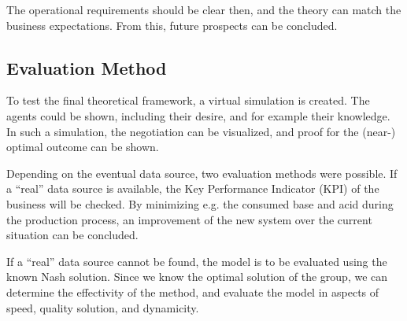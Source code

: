 The operational requirements  should be clear then, and the theory can match the business expectations. From this, future prospects can be concluded.

\subsection{Evaluation Method}
To test the final theoretical framework, a virtual simulation is created. The agents could be shown, including their desire, and for example their knowledge. In such a simulation, the negotiation can be visualized, and proof for the (near-) optimal outcome can be shown. 

Depending on the eventual data source, two evaluation methods were possible. If a ``real'' data source is available, the Key Performance Indicator (KPI) of the business will be checked. By minimizing e.g. the consumed base and acid during the production process, an improvement of the new system over the current situation can be concluded. 

If a ``real'' data source cannot be found, the model is to be evaluated using the known Nash solution. Since we know the optimal solution of the group, we can determine the effectivity of the method, and evaluate the model in aspects of speed, quality solution, and dynamicity.

